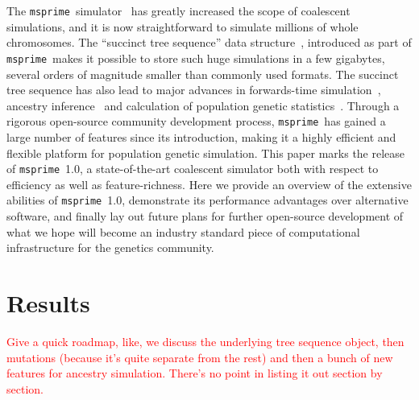 \documentclass{article}
\newcommand{\msprime}[0]{\texttt{msprime}}
\newcommand{\jkcomment}[1]{\textcolor{red}{#1}}
\begin{document}
The \msprime\ simulator~\citep{kelleher2016efficient,kelleher2020coalescent}
has greatly increased the scope of coalescent simulations,
and it is now straightforward to simulate millions of whole chromosomes.
The ``succinct tree sequence'' data
structure~\citep{kelleher2016efficient,kelleher2018efficient,kelleher2019inferring,
wohns2021unified},
introduced as part of \msprime\, makes it possible to store
such huge simulations in a few gigabytes, several orders
of magnitude smaller than commonly used formats.
The succinct tree sequence has also lead to major advances in forwards-time
simulation~\citep{kelleher2018efficient,haller2018tree},
ancestry inference~\citep{kelleher2019inferring,wohns2021unified}
and calculation of population genetic
statistics~\citep{kelleher2016efficient,ralph2020efficiently}.
Through a rigorous open-source community development process,
\msprime\ has gained a large number of features since its introduction,
making it a highly efficient and flexible platform for population
genetic simulation.
This paper marks the release of \msprime\ 1.0, a state-of-the-art
coalescent simulator both with respect to efficiency as well as feature-richness.
Here we provide an overview of the extensive abilities of \msprime\ 1.0,
demonstrate its performance advantages over alternative software,
and finally lay out future plans for
further open-source development of what we hope will become an industry
standard piece of computational infrastructure for the genetics community.

\section*{Results}

\jkcomment{Give a quick roadmap,
like, we discuss the underlying tree sequence object,
then mutations (because it's quite separate from the rest)
and then a bunch of new features for ancestry simulation. There's no
point in listing it out section by section.}

\end{document}
